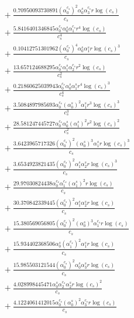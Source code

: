 \documentclass[10pt]{article}
\begin{document}
\begin{align*}
&{}  + \frac{0.70950093730891 \left(\alpha_{0}^{c_s}\right)^{2} \alpha_{0}^s \alpha_{3}^{c_s} r \log{\left(c_{s} \right)}}{c_{s}} \\
&{}  + \frac{5.8416401346845 \alpha_{0}^{c_s} \alpha_{0}^s \alpha_{1}^{c_s} r^{4} \log{\left(c_{s} \right)}}{c_{s}^{4}} \\
&{}  + \frac{0.10412751301962 \left(\alpha_{0}^{c_s}\right)^{4} \alpha_{0}^s \alpha_{1}^s r \log{\left(c_{s} \right)}^{3}}{c_{s}} \\
&{}  + \frac{13.657124688295 \alpha_{0}^{c_s} \alpha_{1}^s \alpha_{2}^{c_s} r^{2} \log{\left(c_{s} \right)}}{c_{s}^{2}} \\
&{}  + \frac{0.21860625039943 \alpha_{0}^{c_s} \alpha_{0}^s \alpha_{1}^s r^{4} \log{\left(c_{s} \right)}^{3}}{c_{s}^{4}} \\
&{}  + \frac{3.5084897985693 \alpha_{0}^{c_s} \left(\alpha_{0}^s\right)^{2} \alpha_{1}^s r^{3} \log{\left(c_{s} \right)}^{3}}{c_{s}^{3}} \\
&{}  + \frac{28.581247445727 \alpha_{0}^{c_s} \alpha_{0}^s \left(\alpha_{1}^s\right)^{2} r^{2} \log{\left(c_{s} \right)}^{2}}{c_{s}^{2}} \\
&{}  + \frac{3.6423965717326 \left(\alpha_{0}^{c_s}\right)^{2} \left(\alpha_{0}^s\right)^{3} \alpha_{1}^s r \log{\left(c_{s} \right)}^{3}}{c_{s}} \\
&{}  + \frac{3.6534923821435 \left(\alpha_{0}^{c_s}\right)^{2} \alpha_{1}^s \alpha_{2}^s r \log{\left(c_{s} \right)}^{3}}{c_{s}} \\
&{}  + \frac{29.97030824438 \alpha_{0}^{c_s} \alpha_{1}^{c_s} \left(\alpha_{1}^s\right)^{2} r \log{\left(c_{s} \right)}}{c_{s}} \\
&{}  + \frac{30.370842339445 \left(\alpha_{0}^{c_s}\right)^{2} \alpha_{1}^s \alpha_{2}^s r \log{\left(c_{s} \right)}}{c_{s}} \\
&{}  + \frac{15.380569056805 \left(\alpha_{0}^{c_s}\right)^{2} \left(\alpha_{0}^s\right)^{3} \alpha_{1}^{c_s} r \log{\left(c_{s} \right)}}{c_{s}} \\
&{}  + \frac{15.934402368506 \alpha_{0}^s \left(\alpha_{1}^{c_s}\right)^{2} \alpha_{1}^s r \log{\left(c_{s} \right)}}{c_{s}} \\
&{}  + \frac{15.985503121544 \left(\alpha_{0}^{c_s}\right)^{2} \alpha_{0}^s \alpha_{3}^s r \log{\left(c_{s} \right)}}{c_{s}} \\
&{}  + \frac{4.028998445471 \alpha_{0}^s \alpha_{2}^{c_s} \alpha_{2}^s r \log{\left(c_{s} \right)}^{2}}{c_{s}} \\
&{}  + \frac{4.1224061412015 \alpha_{0}^{c_s} \left(\alpha_{0}^s\right)^{2} \alpha_{3}^{c_s} r \log{\left(c_{s} \right)}}{c_{s}} \\

\end{align*}
\end{document}
